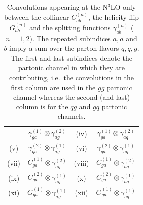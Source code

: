 \documentclass[12pt]{article}
\begin{document}
\begin{appendix}
\begin{table}
\begin{tabular}{ |c|c||c|c| }
& $\gamma^{(1)}_{ga}\otimes\gamma^{(2)}_{ag}$

& \multirow{1}{*}{(iv)} 

& $\gamma^{(1)}_{ga}\otimes\gamma^{(2)}_{aq}$  \\

\multirow{1}{*}{(v)} 

& $\gamma^{(2)}_{ga}\otimes\gamma^{(1)}_{ag}$

& \multirow{1}{*}{(vi)} 

& $\gamma^{(2)}_{ga}\otimes\gamma^{(1)}_{aq}$  \\

\multirow{1}{*}{(vii)} 

& $C^{(1)}_{ga}\otimes\gamma^{(2)}_{ag}$

& \multirow{1}{*}{(viii)} 

& $C^{(1)}_{ga}\otimes\gamma^{(2)}_{aq}$  \\

\multirow{1}{*}{(ix)} 

& $C^{(2)}_{ga}\otimes\gamma^{(1)}_{ag}$

& \multirow{1}{*}{(x)} 

& $C^{(2)}_{ga}\otimes\gamma^{(1)}_{aq}$  \\

\multirow{1}{*}{(xi)} 

& $G^{(1)}_{ga}\otimes\gamma^{(1)}_{ag}$

& \multirow{1}{*}{(xii)} 

& $G^{(1)}_{ga}\otimes\gamma^{(1)}_{aq}$  \\

\hline
\end{tabular}
\caption{\label{Table:convosN3LO}
{Convolutions appearing at the N$^{3}$LO-only between the collinear $C^{(n)}_{ab}$, the helicity-flip $G^{(n)}_{ab}$ and the splitting functions $\gamma^{(n)}_{ab}$ ($n=1,2)$. The repeated subindices $a,a$ and $b$ imply a sum over the parton flavors $q,\bar{q},g$.  The first and last subindices denote the partonic channel in which they are contributing, i.e.\ the convolutions in the first column are used in the $gg$ partonic channel whereas the second (and last) column is for the $qg$ and $gq$ partonic channels.
}}
\renewcommand{\arraystretch}{1}
\end{table}


\end{appendix}
\end{document}
